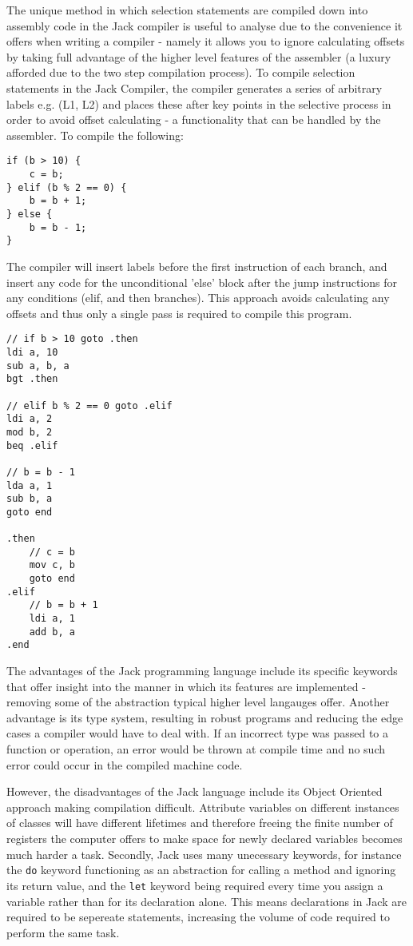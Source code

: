 The unique method in which selection statements are compiled down into assembly code in the Jack compiler is useful to analyse due to the convenience it offers when writing a compiler - namely it allows you to ignore calculating offsets by taking full advantage of the higher level features of the assembler (a luxury afforded due to the two step compilation process). To compile selection statements in the Jack Compiler, the compiler generates a series of arbitrary labels e.g. (L1, L2) and places these after key points in the selective process in order to avoid offset calculating - a functionality that can be handled by the assembler. To compile the following:
\begin{lstlisting}
if (b > 10) {
    c = b;
} elif (b % 2 == 0) {
    b = b + 1; 
} else {
    b = b - 1;
}
\end{lstlisting}

The compiler will insert labels before the first instruction of each branch, and insert any code for the unconditional 'else' block after the jump instructions for any conditions (elif, and then branches). This approach avoids calculating any offsets and thus only a single pass is required to compile this program.

\begin{lstlisting}
// if b > 10 goto .then
ldi a, 10
sub a, b, a 
bgt .then

// elif b % 2 == 0 goto .elif
ldi a, 2
mod b, 2
beq .elif

// b = b - 1
lda a, 1
sub b, a
goto end

.then
    // c = b
    mov c, b
    goto end
.elif
    // b = b + 1
    ldi a, 1
    add b, a
.end
\end{lstlisting}

The advantages of the Jack programming language include its specific keywords that offer insight into the manner in which its features are implemented - removing some of the abstraction typical higher level langauges offer. Another advantage is its type system, resulting in robust programs and reducing the edge cases a compiler would have to deal with. If an incorrect type was passed to a function or operation, an error would be thrown at compile time and no such error could occur in the compiled machine code.

However, the disadvantages of the Jack language include its Object Oriented approach making compilation difficult. Attribute variables on different instances of classes will have different  lifetimes and therefore freeing the finite number of registers the computer offers to make space for newly declared variables becomes much harder a task. Secondly, Jack uses many unecessary keywords, for instance the \texttt{do} keyword functioning as an abstraction for calling a method and ignoring its return value, and the \texttt{let} keyword being required every time you assign a variable rather than for its declaration alone. This means declarations in Jack are required to be sepereate statements, increasing the volume of code required to perform the same task.


